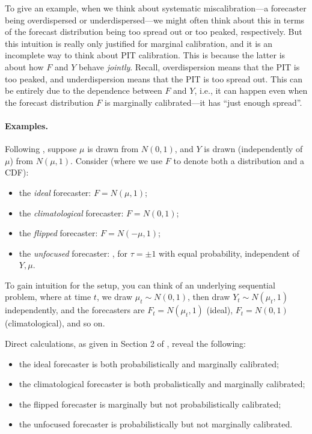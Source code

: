 \documentclass{article}
\begin{document}
To give an example, when we think about systematic miscalibration---a forecaster 
being overdispersed or underdispersed---we might often think about this in terms 
of the forecast distribution being too spread out or too peaked, respectively.
But this intuition is really only justified for marginal calibration, and it is an
incomplete way to think about PIT calibration. This is because the latter is
about how $F$ and $Y$ behave \emph{jointly}. Recall, overdispersion means that
the PIT is too peaked, and underdispersion means that the PIT is too spread
out. This can be entirely due to the dependence between $F$ and $Y$, i.e., it
can happen even when the forecast distribution $F$ is marginally calibrated---it
has ``just enough spread''.

\paragraph{Examples.}

Following \citet{gneiting2007probabilistic}, suppose $\mu$ is drawn from $N(0, 
1)$, and $Y$ is drawn (independently of $\mu$) from $N(\mu, 1)$. Consider (where
we use $F$ to denote both a distribution and a CDF):

\begin{itemize}
\item the \emph{ideal} forecaster: $F = N(\mu, 1)$;
\item the \emph{climatological} forecaster: $F = N(0, 1)$;
\item the \emph{flipped} forecaster: $F = N(-\mu, 1)$;  
\item the \emph{unfocused} forecaster: , for $\tau = \pm 1$ with equal probability, independent 
  of $Y,\mu$.
\end{itemize}

To gain intuition for the setup, you can think of an underlying sequential
problem, where at time $t$, we draw $\mu_t \sim N(0,1)$, then draw $Y_t \sim
N(\mu_t, 1)$ independently, and the forecasters are $F_t = N(\mu_t, 1)$ (ideal),
$F_t = N(0, 1)$ (climatological), and so on.

Direct calculations, as given in Section 2 of \citet{gneiting2007probabilistic}, 
reveal the following: 

\begin{itemize}
\item the ideal forecaster is both probabilistically and marginally calibrated;  
\item the climatological forecaster is both probalistically and marginally
  calibrated;
\item the flipped forecaster is marginally but not probabilistically
  calibrated; 
\item the unfocused forecaster is probabilistically but not marginally
  calibrated.
\end{itemize}
\end{document}
